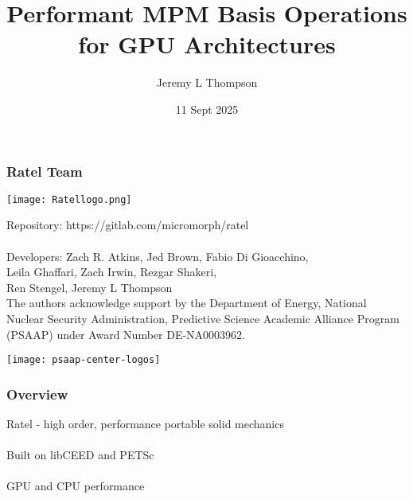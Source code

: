 \documentclass{beamer}
\title[Matrix-Free MPM]{Performant MPM Basis Operations for GPU Architectures} %
\author{Jeremy L Thompson} %
\institute[CU Boulder] %
{University of Colorado Boulder \\ %
\medskip
\textit{jeremy@jeremylt.org} %
}
\date{11 Sept 2025} %
\begin{document}
\begin{frame}
\titlepage %
\end{frame}
 

\begin{frame}
\frametitle{Ratel Team}

\begin{center}
\texttt{[image: Ratellogo.png]}
\end{center}

{\flushleft

Repository: https://gitlab.com/micromorph/ratel\\

~\\

Developers: Zach R. Atkins, Jed Brown, Fabio Di Gioacchino,\\
\hspace{19mm} Leila Ghaffari, Zach Irwin, Rezgar Shakeri,\\
\hspace{19mm} Ren Stengel, Jeremy L Thompson\\

The authors acknowledge support by the Department of Energy, National Nuclear Security Administration, Predictive Science Academic Alliance Program (PSAAP) under Award Number DE-NA0003962.

}

\begin{center}
\texttt{[image: psaap-center-logos]}
\end{center}

\end{frame}


\begin{frame}
\begin{center}
\frametitle{Overview}

Ratel - high order, performance portable solid mechanics\\

~\\

Built on libCEED and PETSc\\

~\\

GPU and CPU performance\\

~\\

\end{center}
\end{frame}
 
\end{document}
